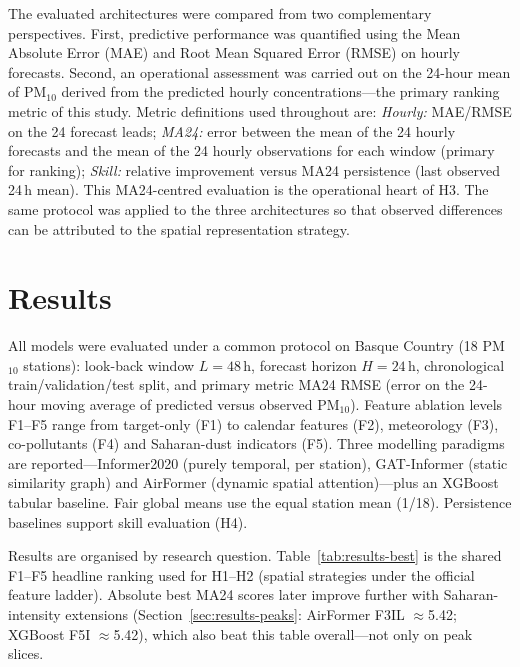 \documentclass[11pt]{article}
\newenvironment{revnewblock}{%
  \begingroup\color{orange!75!black}%
}{%
  \endgroup%
}
\begin{document}
\begin{revnewblock}
The evaluated architectures were compared from two complementary perspectives. First, predictive performance was quantified using the Mean Absolute Error (MAE) and Root Mean Squared Error (RMSE) on hourly forecasts. Second, an operational assessment was carried out on the 24-hour mean of PM$_{10}$ derived from the predicted hourly concentrations---the primary ranking metric of this study. Metric definitions used throughout are: \emph{Hourly:} MAE/RMSE on the 24 forecast leads; \emph{MA24:} error between the mean of the 24 hourly forecasts and the mean of the 24 hourly observations for each window (primary for ranking); \emph{Skill:} relative improvement versus MA24 persistence (last observed 24\,h mean). This MA24-centred evaluation is the operational heart of H3. The same protocol was applied to the three architectures so that observed differences can be attributed to the spatial representation strategy.
\end{revnewblock}

\section{Results}
\label{sec:results}

All models were evaluated under a common protocol on Basque Country (18 PM$_{10}$ stations): look-back window $L{=}48$\,h, forecast horizon $H{=}24$\,h, chronological train/validation/test split, and primary metric MA24 RMSE (error on the 24-hour moving average of predicted versus observed PM$_{10}$). Feature ablation levels F1--F5 range from target-only (F1) to calendar features (F2), meteorology (F3), co-pollutants (F4) and Saharan-dust indicators (F5). Three modelling paradigms are reported---Informer2020 (purely temporal, per station), GAT-Informer (static similarity graph) and AirFormer (dynamic spatial attention)---plus an XGBoost tabular baseline. Fair global means use the equal station mean (1/18). Persistence baselines support skill evaluation (H4).

Results are organised by research question. Table~\ref{tab:results-best} is the shared F1--F5 headline ranking used for H1--H2 (spatial strategies under the official feature ladder). Absolute best MA24 scores later improve further with Saharan-intensity extensions (Section~\ref{sec:results-peaks}: AirFormer F3IL $\approx$5.42; XGBoost F5I $\approx$5.42), which also beat this table overall---not only on peak slices.
\end{document}
